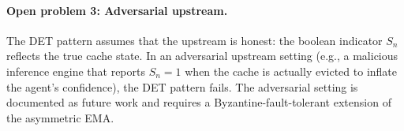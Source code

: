 \paragraph{Open problem 3: Adversarial upstream.}
The DET pattern assumes that the upstream is honest: the boolean
indicator $S_n$ reflects the true cache state. In an adversarial
upstream setting (e.g., a malicious inference engine that reports
$S_n = 1$ when the cache is actually evicted to inflate the agent's
confidence), the DET pattern fails. The adversarial setting is
documented as future work and requires a Byzantine-fault-tolerant
extension of the asymmetric EMA.

